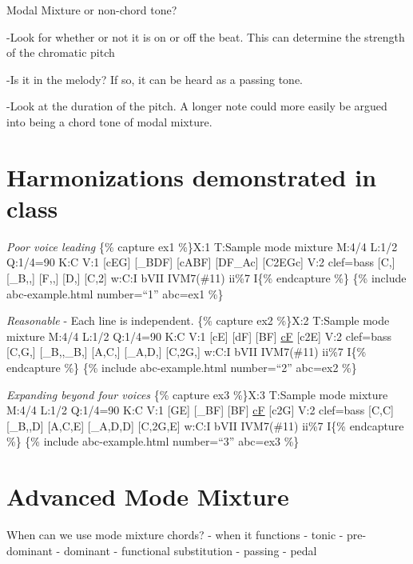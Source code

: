 \documentclass{book}
\begin{document}
Modal Mixture or non-chord tone?

-Look for whether or not it is on or off the beat. This can determine the
strength of the chromatic pitch

-Is it in the melody? If so, it can be heard as a passing tone.

-Look at the duration of the pitch. A longer note could more easily be argued
into being a chord tone of modal mixture.

\hypertarget{harmonizations-demonstrated-in-class}{%
\section{Harmonizations demonstrated in
class}\label{harmonizations-demonstrated-in-class}}

\emph{Poor voice leading} \{\% capture ex1 \%\}X:1 T:Sample mode mixture M:4/4
L:1/2 Q:1/4=90 K:C V:1 {[}cEG{]} {[}\_BDF{]}\textbar{} {[}cABF{]}
{[}DF\_Ac{]}\textbar{} {[}C2EGc{]}\textbar{]} V:2 clef=bass {[}C,{]}
{[}\_B,,{]}\textbar{} {[}F,,{]} {[}D,{]}\textbar{} {[}C,2{]}\textbar{]} w:C:I
bVII IVM7(\#11) ii\%7 I\{\% endcapture \%\} \{\% include abc-example.html
number=``1'' abc=ex1 \%\}

\emph{Reasonable} - Each line is independent. \{\% capture ex2 \%\}X:2
T:Sample mode mixture M:4/4 L:1/2 Q:1/4=90 K:C V:1 {[}cE{]} {[}dF{]}\textbar{}
{[}BF{]} \href{cantusFirmus.html}{cF}\textbar{} {[}c2E{]}\textbar{]} V:2
clef=bass {[}C,G,{]} {[}\_B,,\_B,{]}\textbar{} {[}A,C,{]}
{[}\_A,D,{]}\textbar{} {[}C,2G,{]}\textbar{]} w:C:I bVII IVM7(\#11) ii\%7
I\{\% endcapture \%\} \{\% include abc-example.html number=``2'' abc=ex2 \%\}

\emph{Expanding beyond four voices} \{\% capture ex3 \%\}X:3 T:Sample mode
mixture M:4/4 L:1/2 Q:1/4=90 K:C V:1 {[}GE{]} {[}\_BF{]}\textbar{} {[}BF{]}
\href{cantusFirmus.html}{cF}\textbar{} {[}c2G{]}\textbar{]} V:2 clef=bass
{[}C,C{]} {[}\_B,,D{]}\textbar{} {[}A,C,E{]} {[}\_A,D,D{]}\textbar{}
{[}C,2G,E{]}\textbar{]} w:C:I bVII IVM7(\#11) ii\%7 I\{\% endcapture \%\} \{\%
include abc-example.html number=``3'' abc=ex3 \%\}

\hypertarget{advanced-mode-mixture}{%
\section{Advanced Mode Mixture}\label{advanced-mode-mixture}}

When can we use mode mixture chords? - when it functions - tonic -
pre-dominant - dominant - functional substitution - passing - pedal
\end{document}
